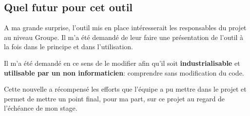 \clearpage

\subsection{Quel futur pour cet outil}
A ma grande surprise, l'outil mis en place intéresserait les responsables du projet au niveau Groupe. Il m'a été demandé de leur faire une présentation de l'outil à la fois dans le principe et dans l'utilisation.

Il m'a été demandé en ce sens de le modifier afin qu'il soit \textbf{industrialisable} et  \textbf{utilisable par un non informaticien}: comprendre sans modification du code.

Cette nouvelle a récompensé les efforts que l'équipe a pu mettre dans le projet et permet de mettre un point final, pour ma part, sur ce projet au regard de l'échéance de mon stage.